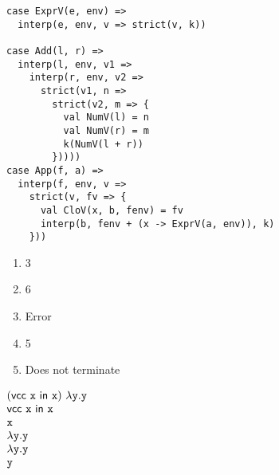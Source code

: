 \textbf{}
\vspace{-1em}
\begin{verbatim}
case ExprV(e, env) =>
  interp(e, env, v => strict(v, k))

case Add(l, r) =>
  interp(l, env, v1 =>
    interp(r, env, v2 =>
      strict(v1, n =>
        strict(v2, m => {
          val NumV(l) = n
          val NumV(r) = m
          k(NumV(l + r))
        }))))
case App(f, a) =>
  interp(f, env, v =>
    strict(v, fv => {
      val CloV(x, b, fenv) = fv
      interp(b, fenv + (x -> ExprV(a, env)), k)
    }))
\end{verbatim}

\textbf{}
\begin{enumerate}
  \item 3
  \item 6
  \item Error
  \item 5
  \item Does not terminate
\end{enumerate}

\textbf{}

$\begin{array}{@{}l}
  \eapp{(\evcc{\cx}{\cx})}{\efun{\cy}{\cy}} \\
  \evcc{\cx}{\cx} \\
  \cx \\
  \efun{\cy}{\cy} \\
  \efun{\cy}{\cy} \\
  \cy \\
\end{array}$
\\

\textbf{}

